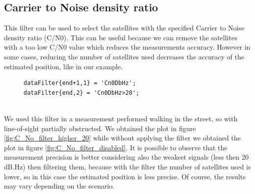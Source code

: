 \subsection{Carrier to Noise density ratio}
\label{subsec:carrier_to_noise_density_ration}
This filter can be used to select the satellites with the specified Carrier to Noise density ratio (C/N0). This can be useful because we can remove the satellites with a too low C/N0 value which reduces the measurements accuracy. However in some cases, reducing the number of satellites used decreases the accuracy of the estimated position, like in our example.
\begin{figure}[!htb]
\begin{lstlisting}
dataFilter{end+1,1} = 'Cn0DbHz';
dataFilter{end,2} = 'Cn0DbHz>20';
\end{lstlisting}
\end{figure}
\vspace{-0.2cm}
\\We used this filter in a measurement performed walking in the street, so with line-of-sight partially obstructed. We obtained the plot in figure \ref{fig:C_No_filter_higher_20} while without applying the filter we obtained the plot in figure \ref{fig:C_No_filter_disabled}.
It is possible to observe that the measurement precision is better considering also the weakest signals (less then 20 dB.Hz) then filtering them, because with the filter the number of satellites used is lower, so in this case the estimated position is less precise. Of course, the results may vary depending on the scenario.
